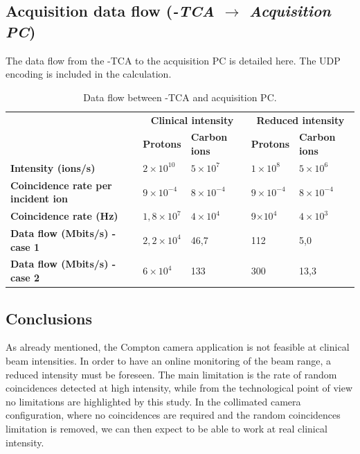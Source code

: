 \clearpage
\newpage
\subsection{Acquisition data flow (\textit{\charmu-TCA $\rightarrow$ Acquisition PC})\newline}

The data flow from the \charmu-TCA to the acquisition PC is detailed here. The UDP encoding is included in the calculation.

\begin{table} [!htbp]
  \centering
\begin{tabular}{|p{3.5cm}|p{3cm}|p{3cm}|p{3cm}|p{3cm}|}
\hline
		&\multicolumn{2}{c|}{	\bf{Clinical intensity}} &\multicolumn{2}{c|}{ \bf{Reduced intensity}} \\
		& \bf{Protons}& \bf{Carbon ions} & \bf{Protons}& \bf{Carbon ions}\\
\hline
\bf{Intensity (ions/s)}		& $2\times10^{10}$	&$5\times10^{7}$  & $1\times10^{8}$& $5\times10^{6}$\\
\bf{Coincidence rate per incident ion}		& $9\times10^{-4}$&  $8\times10^{-4}$&  $9\times10^{-4}$& $8\times10^{-4}$ \\
\bf{Coincidence rate (Hz)}		& $1,8\times10^{7}$&  $4\times10^{4}$&  9$\times10^{4}$& $4\times10^{3}$\\
\bf{Data flow (Mbits/s) - case 1}		&$2,2\times10^{4}$ &  46,7&  112& 5,0\\
\bf{Data flow (Mbits/s) - case 2}		& $6\times10^{4}$&  133&  300& 13,3\\
\hline
\end{tabular}
  \caption{Data flow between \charmu-TCA and acquisition PC.}
\end{table}

\subsection{Conclusions}

As already mentioned, the Compton camera application is not feasible at clinical beam intensities. \newline
In order to have an online monitoring of the beam range, a reduced intensity must be foreseen. The main limitation is the rate of random coincidences detected at high intensity, while from the technological point of view no limitations are highlighted by this study. In the collimated camera configuration, where no coincidences are required and the random coincidences limitation is removed, we can then expect to be able to work at real clinical intensity.
